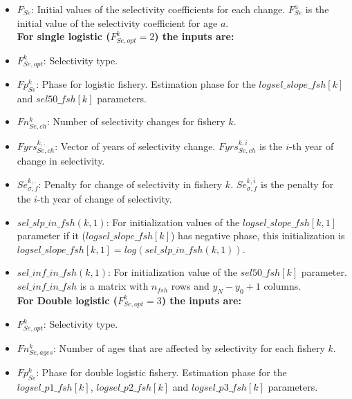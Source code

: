 \documentclass{article}
\begin{document}
\begin{itemize}
    \item $F_{Se}^{.}$: Initial values of the selectivity coefficients for each change. $F_{Se}^{a}$ is the initial value of the selectivity coefficient for age $a$. \\
    
    \textbf{For single logistic ($F^k_{Se,opt}=2$) the inputs are:}\\
    
    \item $F^k_{Se,opt}$: Selectivity type.
    
    \item $Fp_{Se}^k$: Phase for logistic fishery. Estimation phase for the $logsel\_slope\_fsh[k]$ and $sel50\_fsh[k]$ parameters.
    \item $Fn_{Se,ch}^k$: Number of selectivity changes for fishery $k$.
    \item $Fyrs_{Se,ch}^{k, .}$: Vector of years of selectivity change. $Fyrs_{Se,ch}^{k,i}$ is the $i$-th year of change in selectivity.
    \item $Se_{\sigma,f}^{k,.}$: Penalty for change of selectivity in fishery $k$.  $Se_{\sigma,f}^{k,i}$ is the penalty for the $i$-th year of change of selectivity.
    \item $sel\_slp\_in\_fsh(k,1)$: For initialization values of the $logsel\_slope\_fsh[k,1]$ parameter if it ($logsel\_slope\_fsh[k]$) has negative phase, this initialization is $logsel\_slope\_fsh[k,1]=log(sel\_slp\_in\_fsh(k,1))$.
    \item $sel\_inf\_in\_fsh(k,1)$: For initialization value of the $sel50\_fsh[k]$ parameter.     $sel\_inf\_in\_fsh$ is a matrix with $n_{fsh}$ rows and $y_N-y_0+1$ columns. \\
    
    \textbf{For Double logistic ($F^k_{Se,opt}=3$) the inputs are:}\\
    
    \item $F^k_{Se,opt}$: Selectivity type.
    \item $Fn_{Se,ages}^k$: Number of ages that are affected by selectivity for each fishery $k$.
    \item $Fp_{Se}^k$: Phase for double logistic fishery. Estimation phase for the $logsel\_p1\_fsh[k]$, $logsel\_p2\_fsh[k]$ and $logsel\_p3\_fsh[k]$ parameters.
    

\end{itemize}
\end{document}
